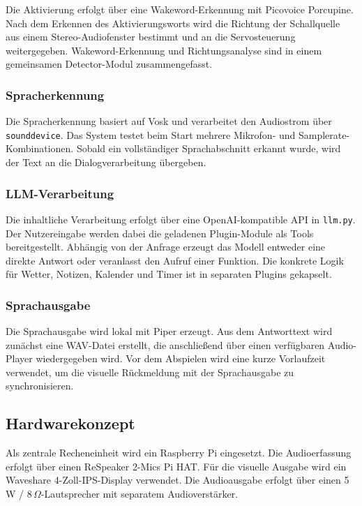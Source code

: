 Die Aktivierung erfolgt über eine Wakeword-Erkennung mit Picovoice Porcupine. Nach dem Erkennen des Aktivierungsworts wird die Richtung der Schallquelle aus einem Stereo-Audiofenster bestimmt und an die Servosteuerung weitergegeben. Wakeword-Erkennung und Richtungsanalyse sind in einem gemeinsamen Detector-Modul zusammengefasst.

\subsubsection{Spracherkennung}

Die Spracherkennung basiert auf Vosk und verarbeitet den Audiostrom über \texttt{sounddevice}. Das System testet beim Start mehrere Mikrofon- und Samplerate-Kombinationen. Sobald ein vollständiger Sprachabschnitt erkannt wurde, wird der Text an die Dialogverarbeitung übergeben.

\subsubsection{LLM-Verarbeitung}

Die inhaltliche Verarbeitung erfolgt über eine OpenAI-kompatible API in \texttt{llm.py}. Der Nutzereingabe werden dabei die geladenen Plugin-Module als Tools bereitgestellt. Abhängig von der Anfrage erzeugt das Modell entweder eine direkte Antwort oder veranlasst den Aufruf einer Funktion. Die konkrete Logik für Wetter, Notizen, Kalender und Timer ist in separaten Plugins gekapselt.

\subsubsection{Sprachausgabe}

Die Sprachausgabe wird lokal mit Piper erzeugt. Aus dem Antworttext wird zunächst eine WAV-Datei erstellt, die anschließend über einen verfügbaren Audio-Player wiedergegeben wird. Vor dem Abspielen wird eine kurze Vorlaufzeit verwendet, um die visuelle Rückmeldung mit der Sprachausgabe zu synchronisieren.

\subsection{Hardwarekonzept}

Als zentrale Recheneinheit wird ein Raspberry Pi eingesetzt. Die Audioerfassung erfolgt über einen ReSpeaker 2-Mics Pi HAT. Für die visuelle Ausgabe wird ein Waveshare 4-Zoll-IPS-Display verwendet. Die Audioausgabe erfolgt über einen 5\,W / 8\,$\Omega$-Lautsprecher mit separatem Audioverstärker.

